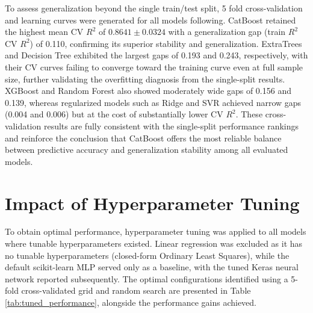 To assess generalization beyond the single train/test split, 5 fold cross-validation and learning curves were generated for all models following\cite{atique2026explainable}. CatBoost retained the highest mean CV \(R^2\) of \(0.8641 \pm 0.0324\) with a generalization gap (train \(R^2\) CV \(R^2\)) of 0.110, confirming its superior stability and generalization. ExtraTrees and Decision Tree exhibited the largest gaps of 0.193 and 0.243, respectively, with their CV curves failing to converge toward the training curve even at full sample size, further validating the overfitting diagnosis from the single-split results. XGBoost and Random Forest also showed moderately wide gaps of 0.156 and 0.139, whereas regularized models such as Ridge and SVR achieved narrow gaps (0.004 and 0.006) but at the cost of substantially lower CV \(R^2\). These cross-validation results are fully consistent with the single-split performance rankings and reinforce the conclusion that CatBoost offers the most reliable balance between predictive accuracy and generalization stability among all evaluated models.



\section{Impact of Hyperparameter Tuning}

To obtain optimal performance, hyperparameter tuning was applied to all models where tunable hyperparameters existed. Linear regression was excluded as it has no tunable hyperparameters (closed-form Ordinary Least Squares), while the default scikit-learn MLP served only as a baseline, with the tuned Keras neural network reported subsequently. The optimal configurations identified using a 5-fold cross-validated grid and random search are presented in Table \ref{tab:tuned_performance}\cite{atique2026explainable}, alongside the performance gains achieved.

